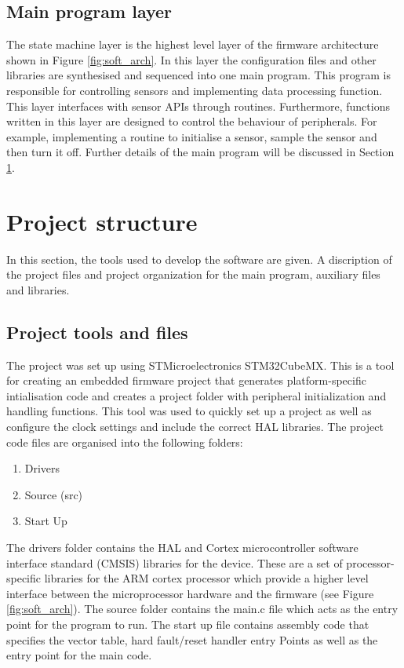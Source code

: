 \subsection{Main program layer}
\label{subsec:ch5_SML}
The state machine layer is the highest level layer of the firmware architecture shown in Figure \ref{fig:soft_arch}. In this layer the configuration files and other libraries are synthesised and sequenced into one main program. This program  is responsible for controlling sensors and implementing data processing function. This layer interfaces with sensor APIs through routines. Furthermore, functions written in this layer are designed to control the behaviour of peripherals. For example, implementing a routine to initialise a sensor, sample the sensor and then turn it off. Further details of the main program will be discussed in Section \ref{sec:ch5_projstruct}.

\section{Project structure}
\label{sec:ch5_projstruct}

In this section, the tools used to develop the software are given. A discription of the project files and  project organization for the main program, auxiliary files and libraries.

\subsection{Project tools and files} 

The project was set up using STMicroelectronics STM32CubeMX. This is a tool for creating an embedded firmware project that generates platform-specific intialisation code  and creates a project folder with peripheral initialization and handling functions. This tool was used to quickly set up a project as well as configure the clock settings and include the correct HAL libraries. The project code files are organised into the following folders:


\begin{enumerate}
	\item Drivers
	\item Source (src)
	\item Start Up 
\end{enumerate}


The drivers folder contains the HAL and Cortex microcontroller software interface standard (CMSIS) libraries for the device. These are a set of processor-specific libraries for the ARM cortex processor which provide a higher level interface between the microprocessor hardware and the firmware (see Figure \ref{fig:soft_arch}). The source folder contains the main.c file which acts as the entry point for the program to run. The start up file contains assembly code that specifies the vector table, hard fault/reset handler entry Points as well as the entry point for the main code. 


